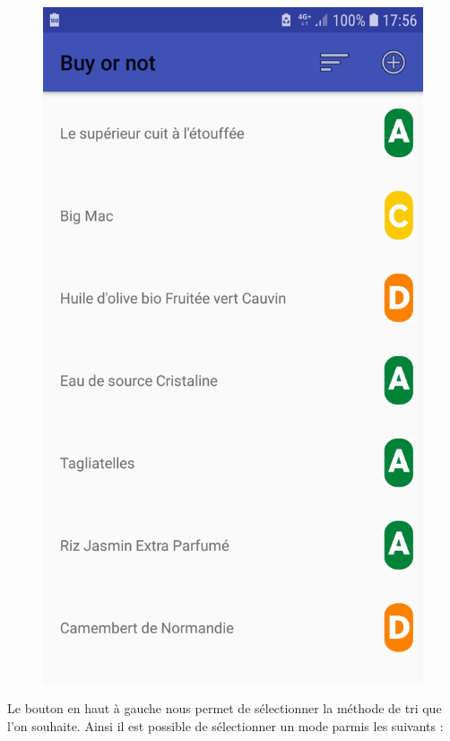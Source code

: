 \documentclass[report]{BetterDocument}
\begin{document}
	\begin{figure}[H]
		\centering\includegraphics[width=0.5\paperwidth, height=0.3\paperheight, keepaspectratio]{img/lister_recent.jpg}
		\label{produit:consulter}
	\end{figure}

	Le bouton en haut à gauche nous permet de sélectionner la méthode de tri que l'on souhaite. Ainsi il est possible de sélectionner un mode parmis les suivants :
\end{document}

